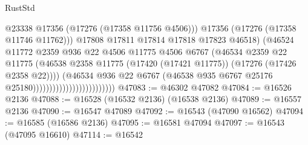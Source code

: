 \begin{lexlean}{RustStd}
\begin{coremodule}
                                                      @23338
                                                      @17356
                                                      (@17276 (@17358 @11756 @4506)))
                                                    @17356
                                                    (@17276 (@17358 @11746 @11762)))
                                                  @17808
                                                  @17811
                                                  @17814
                                                  @17818
                                                  @17823
                                                  @46518)
                                                (@46524
                                                  @11772
                                                  @2359
                                                  @936
                                                  @22
                                                  @4506
                                                  @11775
                                                  @4506
                                                  @6767
                                                  (@46534
                                                    @2359
                                                    @22
                                                    @11775
                                                    (@46538
                                                      @2358
                                                      @11775
                                                      (@17420 (@17421 @11775))
                                                      (@17276 (@17426 @2358 @22))))
                                                  (@46534
                                                    @936
                                                    @22
                                                    @6767
                                                    (@46538
                                                      @935
                                                      @6767
                                                      @25176
                                                      @25180)))))))))))))))))))))))))
@47083 := @46302 @47082
@47084 := @16526 @2136
@47088 := @16528 (@16532 @2136) (@16538 @2136)
@47089 := @16557 @2136
@47090 := @16547 @47089
@47092 := @16543 (@47090 @16562)
@47094 := @16585 (@16586 @2136)
@47095 := @16581 @47094
@47097 := @16543 (@47095 @16610)
@47114 := @16542

\end{coremodule}
\end{lexlean}
